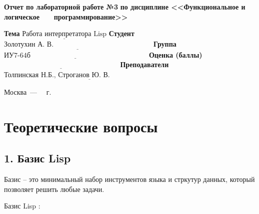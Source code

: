 \documentclass[12pt]{report}
\begin{document}
\begin{titlepage}
		\begin{center}
			\noindent\begin{minipage}{1.1\textwidth}\centering
				\Large\textbf{  Отчет по лабораторной работе №3}\newline
				\textbf{по дисциплине <<Функциональное и логическое}\newline
				\textbf{~~~программирование>>}\newline\newline
			\end{minipage}
		\end{center}
		
		\noindent\textbf{Тема} $\underline{\text{Работа интерпретатора Lisp}}$\newline\newline
		\noindent\textbf{Студент} $\underline{\text{Золотухин А. В.~~~~~~~~~~~~~~~~~~~~~~~~~~~~~~~~~~~~~~~~~~}}$\newline\newline
		\noindent\textbf{Группа} $\underline{\text{ИУ7-64б~~~~~~~~~~~~~~~~~~~~~~~~~~~~~~~~~~~~~~~~~~~~~~~~~~}}$\newline\newline
		\noindent\textbf{Оценка (баллы)} $\underline{\text{~~~~~~~~~~~~~~~~~~~~~~~~~~~~~~~~~~~~~~~~~~~~~~~~~}}$\newline\newline
		\noindent\textbf{Преподаватели} $\underline{\text{Толпинская Н.Б., Строганов Ю. В.~~~~~~~~~~~~~~~~~~~~~~~~~~~~}}$\newline\newline\newline
		
		\begin{center}
			\vfill
			Москва~---~\the\year
			~г.
		\end{center}
	\end{titlepage}
	
	\chapter*{Теоретические вопросы}
	
	\section*{1. Базис Lisp}
	
	Базис -- это минимальный набор инструментов языка и стркутур данных, который позволяет решить любые задачи.
	
	
	Базис Lisp :
	
\end{document}
